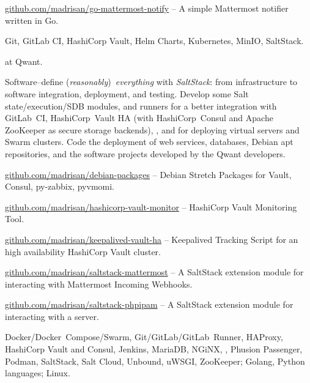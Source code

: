 \smallskip\noindent
\software
\url{github.com/madrisan/go-mattermost-notify} --
A simple Mattermost notifier written in Go.

\smallskip\noindent
\technologies
Git, GitLab CI, HashiCorp Vault, Helm Charts, Kubernetes, MinIO, SaltStack.




 at Qwant.

\smallskip\noindent
\tasks
Software--define ({\it reasonably}\/)~{\it everything\/} with {\it SaltStack\/}:
from infrastructure to software integration, deployment, and testing.
Develop some Salt state/execution/SDB modules, and runners for a better
integration with GitLab~CI, HashiCorp~Vault HA (with HashiCorp~Consul and
Apache ZooKeeper as secure storage backends), \phpIPAM{}, and for deploying
virtual servers and Swarm clusters.
Code the deployment of web services, databases, Debian apt repositories, and the
software projects developed by the Qwant developers.

\smallskip\noindent
\software
\url{github.com/madrisan/debian-packages} --
Debian Stretch Packages for Vault, Consul, py-zabbix, pyvmomi.

\noindent
\url{github.com/madrisan/hashicorp-vault-monitor} --
HashiCorp Vault Monitoring Tool.

\noindent
\url{github.com/madrisan/keepalived-vault-ha} --
Keepalived Tracking Script for an high availability HashiCorp Vault cluster.

\noindent
\url{github.com/madrisan/saltstack-mattermost} --
A SaltStack extension module for interacting with Mattermost Incoming Webhooks.

\noindent
\url{github.com/madrisan/saltstack-phpipam} --
A SaltStack extension module for interacting with a \phpIPAM{} server.


\smallskip\noindent
\technologies
Docker/Docker~Compose/Swarm, Git/GitLab/GitLab~Runner, HAProxy,
HashiCorp Vault and Consul, Jenkins, MariaDB, NGiNX, \phpIPAM,
Phusion Passenger, Podman, SaltStack, Salt Cloud, Unbound, uWSGI, ZooKeeper;
Golang, Python languages; Linux.


